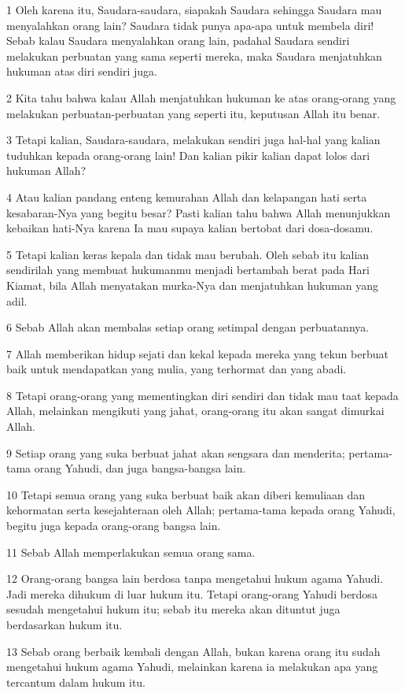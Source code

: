 \par 1 Oleh karena itu, Saudara-saudara, siapakah Saudara sehingga Saudara mau menyalahkan orang lain? Saudara tidak punya apa-apa untuk membela diri! Sebab kalau Saudara menyalahkan orang lain, padahal Saudara sendiri melakukan perbuatan yang sama seperti mereka, maka Saudara menjatuhkan hukuman atas diri sendiri juga.
\par 2 Kita tahu bahwa kalau Allah menjatuhkan hukuman ke atas orang-orang yang melakukan perbuatan-perbuatan yang seperti itu, keputusan Allah itu benar.
\par 3 Tetapi kalian, Saudara-saudara, melakukan sendiri juga hal-hal yang kalian tuduhkan kepada orang-orang lain! Dan kalian pikir kalian dapat lolos dari hukuman Allah?
\par 4 Atau kalian pandang enteng kemurahan Allah dan kelapangan hati serta kesabaran-Nya yang begitu besar? Pasti kalian tahu bahwa Allah menunjukkan kebaikan hati-Nya karena Ia mau supaya kalian bertobat dari dosa-dosamu.
\par 5 Tetapi kalian keras kepala dan tidak mau berubah. Oleh sebab itu kalian sendirilah yang membuat hukumanmu menjadi bertambah berat pada Hari Kiamat, bila Allah menyatakan murka-Nya dan menjatuhkan hukuman yang adil.
\par 6 Sebab Allah akan membalas setiap orang setimpal dengan perbuatannya.
\par 7 Allah memberikan hidup sejati dan kekal kepada mereka yang tekun berbuat baik untuk mendapatkan yang mulia, yang terhormat dan yang abadi.
\par 8 Tetapi orang-orang yang mementingkan diri sendiri dan tidak mau taat kepada Allah, melainkan mengikuti yang jahat, orang-orang itu akan sangat dimurkai Allah.
\par 9 Setiap orang yang suka berbuat jahat akan sengsara dan menderita; pertama-tama orang Yahudi, dan juga bangsa-bangsa lain.
\par 10 Tetapi semua orang yang suka berbuat baik akan diberi kemuliaan dan kehormatan serta kesejahteraan oleh Allah; pertama-tama kepada orang Yahudi, begitu juga kepada orang-orang bangsa lain.
\par 11 Sebab Allah memperlakukan semua orang sama.
\par 12 Orang-orang bangsa lain berdosa tanpa mengetahui hukum agama Yahudi. Jadi mereka dihukum di luar hukum itu. Tetapi orang-orang Yahudi berdosa sesudah mengetahui hukum itu; sebab itu mereka akan dituntut juga berdasarkan hukum itu.
\par 13 Sebab orang berbaik kembali dengan Allah, bukan karena orang itu sudah mengetahui hukum agama Yahudi, melainkan karena ia melakukan apa yang tercantum dalam hukum itu.
